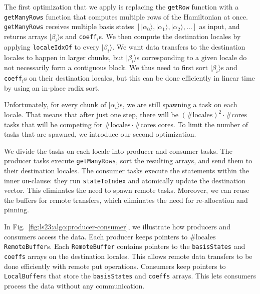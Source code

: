 The first optimization that we apply is replacing the \verb|getRow| function with a \verb|getManyRows| function that computes multiple rows of the Hamiltonian at once. \verb|getManyRows| receives multiple basis states $[|\alpha_0\rangle, |\alpha_1\rangle, |\alpha_2\rangle, \dots]$ as input, and returns arrays $|\beta_i\rangle$s and \verb|coeff|$_i$s. We then compute the destination locales by applying \verb|localeIdxOf| to every $|\beta_i\rangle$. We want data transfers to the destination locales to happen in larger chunks, but $|\beta_i\rangle$s corresponding to a given locale do not necessarily form a contiguous block. We thus need to first sort $|\beta_i\rangle$s and \verb|coeff|$_i$s on their destination locales, but this can be done efficiently in linear time by using an in-place radix sort.

Unfortunately, for every chunk of $|\alpha_i\rangle$s, we are still spawning a task on each locale. That means that after just one step, there will be $(\#\text{locales})^2 \cdot \#\text{cores}$ tasks that will be competing for $\#\text{locales} \cdot \#\text{cores}$ cores. To limit the number of tasks that are spawned, we introduce our second optimization.

We divide the tasks on each locale into producer and consumer tasks. The producer tasks execute \verb|getManyRows|, sort the resulting arrays, and send them to their destination locales. The consumer tasks execute the statements within the inner \verb|on|-clause: they run \verb|stateToIndex| and atomically update the destination vector. This eliminates the need to spawn remote tasks. Moreover, we can reuse the buffers for remote transfers, which eliminates the need for re-allocation and pinning.

In Fig.~\ref{fig:ls23:algo:producer-consumer}, we illustrate how producers and consumers access the data. Each producer keeps pointers to $\#\text{locales}$ \verb|RemoteBuffer|s. Each \verb|RemoteBuffer| contains pointers to the \verb|basisStates| and \verb|coeffs| arrays on the destination locales. This allows remote data transfers to be done efficiently with remote put operations. Consumers keep pointers to \verb|LocalBuffer|s that store the \verb|basisStates| and \verb|coeffs| arrays. This lets consumers process the data without any communication.

